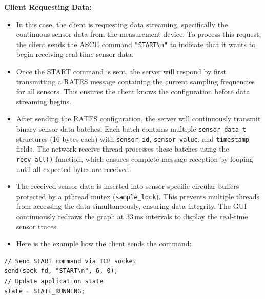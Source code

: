 \textbf{Client Requesting Data:}
\begin{itemize}
\item In this case, the client is requesting data streaming, specifically the continuous
sensor data from the measurement device. To process this request, the client sends
the ASCII command \texttt{"START\textbackslash n"} to indicate that it wants to begin
receiving real-time sensor data.

\item Once the START command is sent, the server will respond by first transmitting a RATES
message containing the current sampling frequencies for all sensors. This ensures the
client knows the configuration before data streaming begins.

\item After sending the RATES configuration, the server will continuously transmit binary
sensor data batches. Each batch contains multiple \texttt{sensor\_data\_t} structures
(16 bytes each) with \texttt{sensor\_id}, \texttt{sensor\_value}, and \texttt{timestamp}
fields. The network receive thread processes these batches using the \texttt{recv\_all()}
function, which ensures complete message reception by looping until all expected bytes
are received.

\item The received sensor data is inserted into sensor-specific circular buffers protected
by a pthread mutex (\texttt{sample\_lock}). This prevents multiple threads from
accessing the data simultaneously, ensuring data integrity. The GUI continuously
redraws the graph at 33\,ms intervals to display the real-time sensor traces.

\item Here is the example how the client sends the command:
\end{itemize}

\begin{verbatim}
// Send START command via TCP socket
send(sock_fd, "START\n", 6, 0);
// Update application state
state = STATE_RUNNING;
\end{verbatim}

